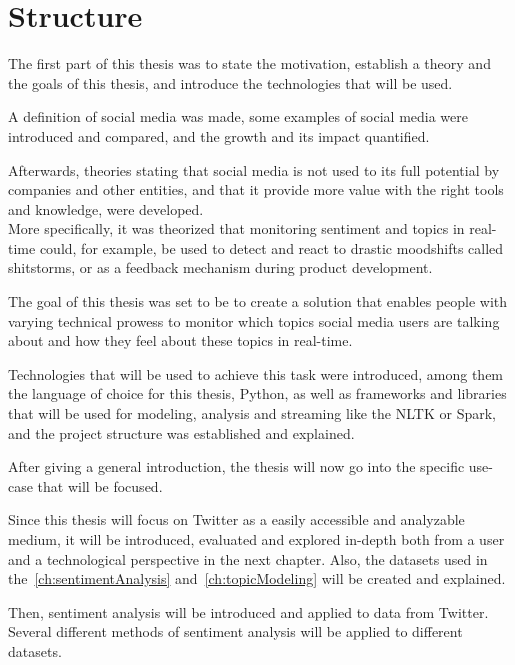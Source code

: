 
\chapter{Structure}
\label{ch:structure}


The first part of this thesis was to state the motivation,
establish a theory and the goals of this thesis, and introduce the technologies that will be used.
\par
A definition of social media was made,
some examples of social media were introduced and compared,
and the growth and its impact quantified.
\par
Afterwards, theories stating that social media is not used to its full potential by companies and other entities,
and that it provide more value with the right tools and knowledge, were developed. \\
More specifically, it was theorized that monitoring sentiment and topics in real-time could, for example,
be used to detect and react to drastic moodshifts called shitstorms, or as a feedback mechanism during product development.
\par
The goal of this thesis was set to be to create a solution that enables people with varying technical prowess to monitor
which topics social media users are talking about and how they feel about these topics in real-time.
\par
Technologies that will be used to achieve this task were introduced, among them the language of choice for this thesis,
Python, as well as frameworks and libraries that will be used for modeling, analysis and streaming like the NLTK or Spark,
and the project structure was established and explained.
\par
After giving a general introduction, the thesis will now go into the specific use-case that will be focused.
\par
Since this thesis will focus on Twitter as a easily accessible and analyzable medium,
it will be introduced, evaluated and explored in-depth both from a user and a technological perspective in the next chapter.
Also, the datasets used in the~\ref{ch:sentimentAnalysis} and~\ref{ch:topicModeling} will be created and explained.
\par
Then, sentiment analysis will be introduced and applied to data from Twitter.
Several different methods of sentiment analysis will be applied to different datasets.
